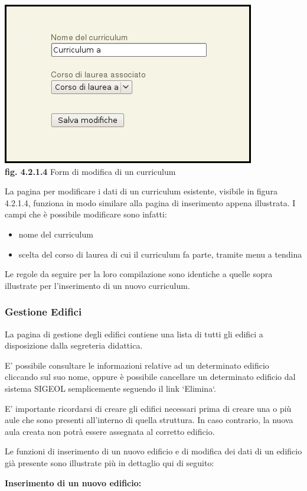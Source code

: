 \documentclass[11pt,a4paper]{article}
\begin{document}
\begin{center}
	\includegraphics[scale=0.5]{images/modifica_curriculum.jpg}\\
	\textbf{fig. 4.2.1.4} Form di modifica di un curriculum\\
\end{center}

La pagina per modificare i dati di un curriculum esistente, visibile in figura 4.2.1.4, funziona in modo similare alla pagina di inserimento appena illustrata. I campi che è possibile modificare sono infatti:
\begin{itemize}
 \item nome del curriculum
 \item scelta del corso di laurea di cui il curriculum fa parte, tramite menu a tendina
\end{itemize}
Le regole da seguire per la loro compilazione sono identiche a quelle sopra illustrate per l'inserimento di un nuovo curriculum.
\subsubsection{Gestione Edifici}
La pagina di gestione degli edifici contiene una lista di tutti gli edifici a disposizione dalla segreteria didattica.

E' possibile consultare le informazioni relative ad un determinato edificio cliccando sul suo nome, oppure è possibile cancellare un determinato edificio dal sistema SIGEOL semplicemente seguendo il link `Elimina`.

E' importante ricordarsi di creare gli edifici necessari prima di creare una o più aule che sono presenti all'interno di quella struttura. In caso contrario, la nuova aula creata non potrà essere assegnata al corretto edificio.

Le funzioni di inserimento di un nuovo edificio e di modifica dei dati di un edificio già presente sono illustrate più in dettaglio qui di seguito:
\newline \newline
\begin{large}\textbf{Inserimento di un nuovo edificio:}\end{large}
\end{document}
